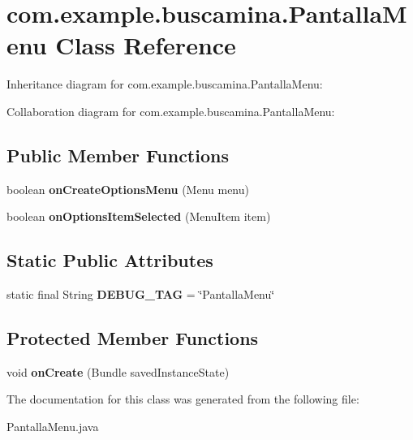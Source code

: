 \section{com.\-example.\-buscamina.\-Pantalla\-Menu Class Reference}
\label{classcom_1_1example_1_1buscamina_1_1_pantalla_menu}


Inheritance diagram for com.\-example.\-buscamina.\-Pantalla\-Menu\-:


Collaboration diagram for com.\-example.\-buscamina.\-Pantalla\-Menu\-:
\subsection*{Public Member Functions}
\begin{DoxyCompactItemize}
\item 
boolean {\bfseries on\-Create\-Options\-Menu} (Menu menu)\label{classcom_1_1example_1_1buscamina_1_1_pantalla_menu_a6dc4b95125b3960d2304d28f6ee7a4b7}

\item 
boolean {\bfseries on\-Options\-Item\-Selected} (Menu\-Item item)\label{classcom_1_1example_1_1buscamina_1_1_pantalla_menu_a761983e226198081e873decd4ec45e86}

\end{DoxyCompactItemize}
\subsection*{Static Public Attributes}
\begin{DoxyCompactItemize}
\item 
static final String {\bfseries D\-E\-B\-U\-G\-\_\-\-T\-A\-G} = \char`\"{}Pantalla\-Menu\char`\"{}\label{classcom_1_1example_1_1buscamina_1_1_pantalla_menu_ab87a2bd7b6c7643c26790b892e129477}

\end{DoxyCompactItemize}
\subsection*{Protected Member Functions}
\begin{DoxyCompactItemize}
\item 
void {\bfseries on\-Create} (Bundle saved\-Instance\-State)\label{classcom_1_1example_1_1buscamina_1_1_pantalla_menu_a78de07bea78300a91f14c1fa48c83b33}

\end{DoxyCompactItemize}


The documentation for this class was generated from the following file\-:\begin{DoxyCompactItemize}
\item 
Pantalla\-Menu.\-java\end{DoxyCompactItemize}

